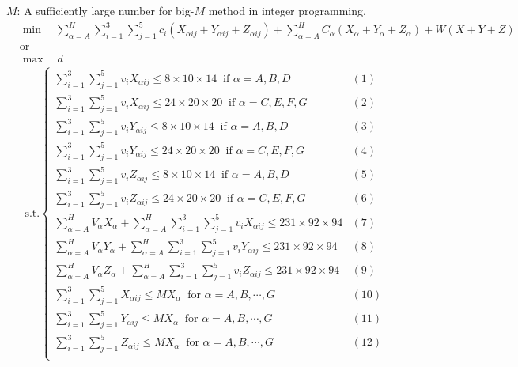 \documentclass{mcmthesis}
\begin{document}
\noindent $M$: A sufficiently large number for big-$M$ method in integer programming. 
\[
\begin{aligned}
&\min\quad\sum_{\alpha=A}^{H}\sum_{i=1}^{3}\sum_{j=1}^{5}c_{i}\left(X_{\alpha ij}+Y_{\alpha ij}+Z_{\alpha ij}\right)
+\sum_{\alpha=A}^{H}C_{{\alpha}}\left(X_{\alpha}+Y_{\alpha }+Z_{\alpha }\right)+W(X+Y+Z)\\
&\text{or}\\
&\max\quad d
\end{aligned}
\]
\[
\begin{aligned}
\text{s.t.}
\left\{
\begin{array}{lr}
\sum\limits_{i=1}^{3}\sum\limits_{j=1}^{5}v_{i}X_{\alpha ij}\le 8\times 10\times 14\ \text{ if }\alpha=A,B,D &(1)\\
\sum\limits_{i=1}^{3}\sum\limits_{j=1}^{5}v_{i}X_{\alpha ij}\le 24\times 20\times 20\ \text{ if }\alpha=C,E,F,G &(2)\\
\sum\limits_{i=1}^{3}\sum\limits_{j=1}^{5}v_{i}Y_{\alpha ij}\le 8\times 10\times 14\ \text{ if }\alpha=A,B,D &(3)\\
\sum\limits_{i=1}^{3}\sum\limits_{j=1}^{5}v_{i}Y_{\alpha ij}\le 24\times 20\times 20\ \text{ if }\alpha=C,E,F,G &(4)\\
\sum\limits_{i=1}^{3}\sum\limits_{j=1}^{5}v_{i}Z_{\alpha ij}\le 8\times 10\times 14\ \text{ if }\alpha=A,B,D &(5)\\
\sum\limits_{i=1}^{3}\sum\limits_{j=1}^{5}v_{i}Z_{\alpha ij}\le 24\times 20\times 20\ \text{ if }\alpha=C,E,F,G &(6)\\
\sum\limits_{\alpha=A}^{H}V_{\alpha}X_{\alpha}+\sum\limits_{\alpha=A}^{H}\sum\limits_{i=1}^{3}\sum\limits_{j=1}^{5}v_{i}X_{\alpha ij}\le 231\times92\times 94&(7)\\
\sum\limits_{\alpha=A}^{H}V_{\alpha}Y_{\alpha}+\sum\limits_{\alpha=A}^{H}\sum\limits_{i=1}^{3}\sum\limits_{j=1}^{5}v_{i}Y_{\alpha ij}\le 231\times92\times 94&(8)\\
\sum\limits_{\alpha=A}^{H}V_{\alpha}Z_{\alpha}+\sum\limits_{\alpha=A}^{H}\sum\limits_{i=1}^{3}\sum\limits_{j=1}^{5}v_{i}Z_{\alpha ij}\le 231\times92\times 94&(9)\\
\sum\limits_{i=1}^{3}\sum\limits_{j=1}^{5}X_{\alpha ij}\le M X_{\alpha}\ \text{ for }\alpha=A,B,\cdots, G&(10)\\
\sum\limits_{i=1}^{3}\sum\limits_{j=1}^{5}Y_{\alpha ij}\le M X_{\alpha}\ \text{ for }\alpha=A,B,\cdots, G&(11)\\
\sum\limits_{i=1}^{3}\sum\limits_{j=1}^{5}Z_{\alpha ij}\le M X_{\alpha}\ \text{ for }\alpha=A,B,\cdots, G&(12)\\

\end{array}
\end{aligned}\]
\end{document}
